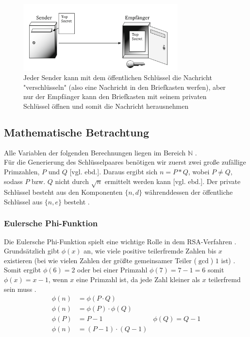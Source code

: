 \documentclass[a4paper,ngerman, headheight=28pt,12pt]{scrartcl}
\newcommand{\vcite}[1]{\cite[vgl.][]{#1}}
\newcommand{\vebd}{[vgl. ebd.]}
\begin{document}
\begin{figure}[h]
  \centering
  \includegraphics[width=0.75\textwidth]{Briefkasten-asymm.png}
  \caption{Jeder Sender kann mit dem öffentlichen Schlüssel die Nachricht "verschlüsseln" (also eine Nachricht in den Briefkasten werfen), aber nur der Empfänger kann den Briefkasten mit seinem privaten Schlüssel öffnen und somit die Nachricht herausnehmen\vcite{fig:Rsa-Cryptography} \label{fig:E2EE}}
\end{figure}

\subsection{Mathematische Betrachtung}
Alle Variablen der folgenden Berechnungen liegen im Bereich $\mathbb{N}$ \vcite{RsaGenCond}. \\
Für die Generierung des Schlüsselpaares benötigen wir zuerst zwei große zufällige Primzahlen, $P$ und $Q$ \vebd. Daraus ergibt sich $n = P * Q$, wobei $P \neq Q$, sodass $P$ bzw. $Q$ nicht durch $\sqrt{n}$ ermittelt werden kann \vebd. Der private Schlüssel besteht aus den Komponenten $\{ n, d \}$ währenddessen der öffentliche Schlüssel aus $\{ n, e \}$ besteht \vcite{RsaVariables}.
\subsubsection{Eulersche Phi-Funktion}
Die Eulersche Phi-Funktion spielt eine wichtige Rolle in dem RSA-Verfahren \vcite{TotientFuncMultiplicative}. Grundsätzlich gibt $\phi(x)$ an, wie viele positive teilerfremde Zahlen bis $x$ existieren (bei wie vielen Zahlen der größte gemeinsamer Teiler ($\gcd$) $1$ ist) \vcite{EulersTotientFunction}. Somit ergibt $\phi(6) = 2$  oder bei einer Primzahl $\phi(7) = 7 - 1 = 6$ somit $\phi(x) = x-1$, wenn $x$ eine Primzahl ist, da jede Zahl kleiner als $x$ teilerfremd sein muss \vcite{TotientFuncMultiplicative}.
\begin{equation*}
  \begin{aligned}
    \phi(n) & = \phi(P \cdot Q)                                                \\
    \phi(n) & = \phi(P) \cdot \phi(Q)                                          \\
    \phi(P) & = P -1                                          & \phi(Q) = Q -1 \\
    \phi(n) & = \left(P - 1 \right) \cdot \left( Q - 1\right)
  \end{aligned}
\end{equation*}
\end{document}
